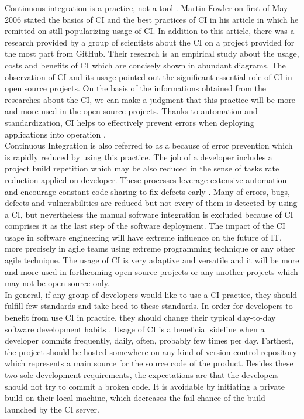 Continuous integration is a practice, not a tool \cite{CollabNet}. Martin Fowler on first of May 2006 stated the basics of CI and the best practices of CI in his article in which he remitted on still popularizing usage of CI. In addition to this article, there was a research provided by a group of scientists about the CI on a project provided for the most part from GitHub. Their research is an empirical study about the usage, costs and benefits of CI which are concisely shown in abundant diagrams. The observation of CI and its usage pointed out the significant essential role of CI in open source projects. On the basis of the informations obtained from the researches about the CI, we can make a judgment that this practice will be more and more used in the open source projects. Thanks to automation and standardization, CI helps to effectively prevent errors when deploying applications into operation \cite{CIcure}.\\

Continuous Integration is also referred to as a  \cite{CIcure} because of error prevention which is rapidly reduced by using this practice. The job of a developer includes a project build repetition which may be also reduced in the sense of tasks rate reduction applied on developer. These processes leverage extensive automation and encourage constant code sharing to fix defects early \cite{DigitalOceanCI}. Many of errors, bugs, defects and vulnerabilities are reduced but not every of them is detected by using a CI, but nevertheless the manual software integration is excluded because of CI comprises it as the last step of the software deployment. The impact of the CI usage in software engineering will have extreme influence on the future of IT, more precisely in agile teams using extreme programming technique or any other agile technique. The usage of CI is very adaptive and versatile and it will be more and more used in forthcoming open source projects or any another projects which may not be open source only.\\

In general, if any group of developers would like to use a CI practice, they should fulfill few standards and take heed to these standards. In order for developers to benefit from use CI in practice, they should change their typical day-to-day software development habits \cite{CIQualityFramework}. Usage of CI is a beneficial sideline when a developer commits frequently, daily, often, probably few times per day. Farthest, the project should be hosted somewhere on any kind of version control repository which represents a main source for the source code of the product. Besides these two sole development requirements, the expectations are that the developers should not try to commit a broken code. It is avoidable by initiating a private build on their local machine, which decreases the fail chance of the build launched by the CI server.\\

